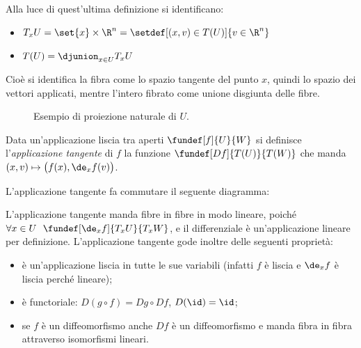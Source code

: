 Alla luce di quest'ultima definizione si identificano:
\begin{itemize}
	\item $T_x U = \set{x} \times \R ^n = \setdef[(x,v)\in T(U)]{v \in \R^n}$
	\item $T(U) = \djunion_{x \in U} T_x U$
\end{itemize}
Cioè si identifica la fibra come lo spazio tangente del punto $x$,
quindi lo spazio dei vettori applicati,
mentre l'intero fibrato come unione disgiunta delle fibre.

\begin{figure}
	\centering
	
	\caption{Esempio di proiezione naturale di $U$.}
\end{figure}

\begin{defn}
	Data un'applicazione liscia tra aperti $\fundef[f]{U}{W}$
	si definisce l'\emph{applicazione tangente} di $f$
	la funzione $\fundef[Df]{T(U)}{T(W)}$
	che manda $(x,v) \mapsto \big(f(x), \de_xf(v)\big)$.
\end{defn}

\begin{oss}
	L'applicazione tangente fa commutare il seguente diagramma:
	\begin{center}
	\end{center}
\end{oss}

\begin{oss}
	L'applicazione tangente manda fibre in fibre in modo lineare,
	poiché $\forall x\in U\ \ \fundef[\de_xf]{T_x U}{T_x W}$,
	e il differenziale è un'applicazione lineare per definizione.
	L'applicazione tangente gode inoltre delle seguenti proprietà:
	\begin{itemize}
		\item
			è un'applicazione liscia in tutte le sue variabili
			(infatti $f$ è liscia e $\de_xf$ è liscia perché lineare);
		\item è functoriale: $D(g\circ f) = Dg\circ Df$, $D(\id) = \id$;
		\item
			se $f$ è un diffeomorfismo anche $Df$ è un diffeomorfismo
			e manda fibra in fibra attraverso isomorfismi lineari.
	\end{itemize}
\end{oss}

